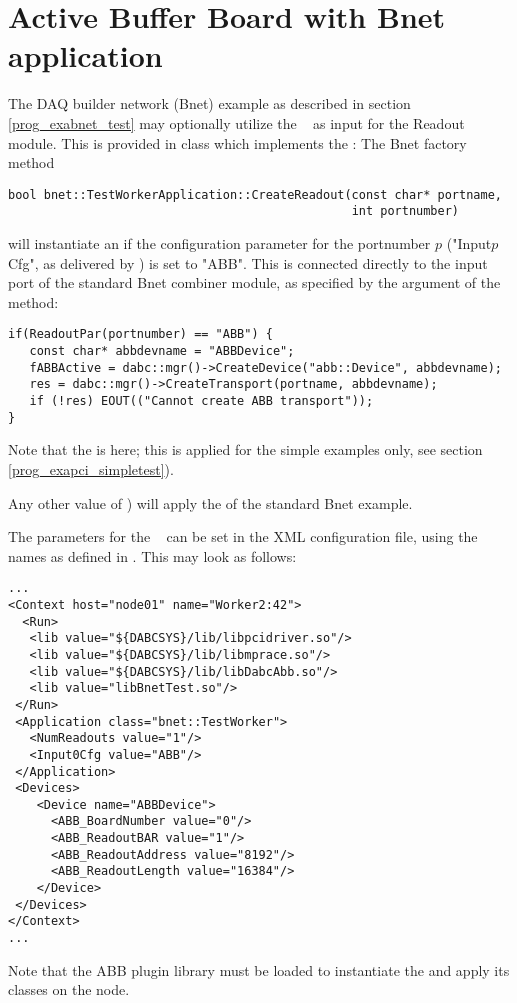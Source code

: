 \section{Active Buffer Board with Bnet application}
\label{prog_exapci_bnet}
The DAQ builder network (Bnet) example as described in section
\ref{prog_exabnet_test} may optionally utilize the \ABB~
as input for the Readout module. This is provided in
class   which implements
the : 
The Bnet factory method 
\begin{small}
\begin{verbatim}
bool bnet::TestWorkerApplication::CreateReadout(const char* portname, 
                                                int portnumber)
\end{verbatim}
\end{small}
will instantiate an 
if the configuration parameter for the portnumber $p$ 
("Input$p$Cfg", as delivered by ) is set to "ABB".
This  is connected  
directly to the input port of the standard Bnet combiner module, as specified by
the  argument of the method:

\begin{small}
\begin{verbatim}
if(ReadoutPar(portnumber) == "ABB") {
   const char* abbdevname = "ABBDevice";
   fABBActive = dabc::mgr()->CreateDevice("abb::Device", abbdevname);
   res = dabc::mgr()->CreateTransport(portname, abbdevname);
   if (!res) EOUT(("Cannot create ABB transport"));
} 
\end{verbatim}
\end{small}

Note that the  is  here; 
this is applied for the simple examples only, 
see section \ref{prog_exapci_simpletest}). 

Any other value of ) will
apply the  of the standard Bnet example. 

The parameters for the \ABB~
can be set in the XML configuration file, using the names as defined
in . This may look as follows:

\begin{small}
\begin{verbatim}
...
<Context host="node01" name="Worker2:42">
  <Run>
   <lib value="${DABCSYS}/lib/libpcidriver.so"/>          
   <lib value="${DABCSYS}/lib/libmprace.so"/>
   <lib value="${DABCSYS}/lib/libDabcAbb.so"/>          
   <lib value="libBnetTest.so"/>
 </Run> 
 <Application class="bnet::TestWorker">
   <NumReadouts value="1"/>
   <Input0Cfg value="ABB"/>
 </Application>
 <Devices>        
    <Device name="ABBDevice">
      <ABB_BoardNumber value="0"/>
      <ABB_ReadoutBAR value="1"/> 
      <ABB_ReadoutAddress value="8192"/>
      <ABB_ReadoutLength value="16384"/> 
    </Device>
 </Devices>      
</Context>
...
\end{verbatim}
\end{small}

Note that the ABB plugin library  must be loaded
to instantiate the  and apply its classes on the node.


